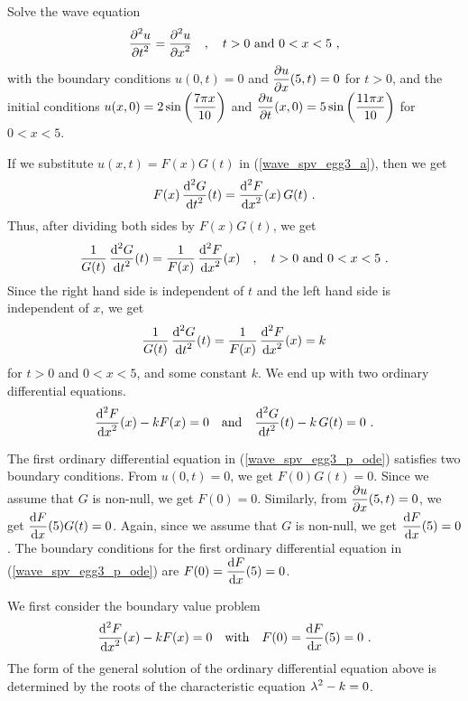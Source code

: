 \begin{egg}
Solve the wave equation
\begin{equation} \label{wave_spv_egg3_a}
\frac{\displaystyle \partial^{2}{u}} {\displaystyle \partial t^{2}} = \frac{\displaystyle \partial^{2}{u}} {\displaystyle \partial x^{2}} \quad , \quad t > 0 \
\text{and} \ 0 < x < 5 \ ,
\end{equation}
with the boundary conditions
$u(0,t) = 0$ and $\displaystyle \frac{\partial{u}}{\partial x}(5,t) = 0$ for $t > 0$,
and the initial conditions
$\displaystyle u(x,0) = 2 \sin\left(\frac{7\pi x}{10}\right)$
and
$\displaystyle \frac{\partial{u}}{\partial t}(x,0) = 5 \sin\left(\frac{11 \pi x}{10}\right)$
for $0 < x < 5$.

If we substitute $u(x,t) = F(x)G(t)$ in (\ref{wave_spv_egg3_a}), then we get
\[
F(x)\,\frac{\displaystyle \mathrm{d}^{2}{G}} {\displaystyle \mathrm{d}{t}^{2}}(t) = \frac{\displaystyle \mathrm{d}^{2}{F}} {\displaystyle \mathrm{d}{x}^{2}}(x)\, G(t) \ .
\]
Thus, after dividing both sides by $F(x)G(t)$, we get
\[
\frac{1}{G(t)} \, \frac{\displaystyle \mathrm{d}^{2}{G}} {\displaystyle \mathrm{d}{t}^{2}}(t) = \frac{1}{F(x)}\, \frac{\displaystyle \mathrm{d}^{2}{F}} {\displaystyle \mathrm{d}{x}^{2}}(x)
\quad , \quad t>0 \ \text{and} \ 0<x<5 \ .
\]
Since the right hand side is independent of $t$ and the left hand side
is independent of $x$, we get
\[
\frac{1}{G(t)} \, \frac{\displaystyle \mathrm{d}^{2}{G}} {\displaystyle \mathrm{d}{t}^{2}}(t) = \frac{1}{F(x)}\,
\frac{\displaystyle \mathrm{d}^{2}{F}} {\displaystyle \mathrm{d}{x}^{2}}(x) = k
\]
for $t>0$ and $0<x<5$, and some constant $k$.  We end up with two
ordinary differential equations.
\begin{equation} \label{wave_spv_egg3_p_ode}
\frac{\displaystyle \mathrm{d}^{2}{F}} {\displaystyle \mathrm{d}{x}^{2}}(x) -k F(x) = 0 \quad \text{and}
\quad \frac{\displaystyle \mathrm{d}^{2}{G}} {\displaystyle \mathrm{d}{t}^{2}}(t) - k\,G(t) = 0 \ .
\end{equation}

The first ordinary differential equation in
(\ref{wave_spv_egg3_p_ode}) satisfies two boundary
conditions.   From $u(0,t) = 0$, we get $F(0)G(t)=0$.  Since we assume
that $G$ is non-null, we get $F(0)=0$.  Similarly, from
$\displaystyle \frac{\partial{u}}{\partial x}(5,t) = 0$, we get
$\displaystyle \frac{\mathrm{d}F}{\mathrm{d}{x}}(5)G(t)=0$.
Again, since we assume that $G$ is non-null, we get
$\displaystyle \frac{\mathrm{d}F}{\mathrm{d}{x}}(5)=0$.  The
boundary conditions for the first ordinary differential equation in
(\ref{wave_spv_egg3_p_ode}) are $\displaystyle F(0)=\frac{\mathrm{d}F}{\mathrm{d}{x}}(5)=0$. 

We first consider the boundary value problem
\begin{equation} \label{wave_spv_egg3_p_bvp}
\frac{\displaystyle \mathrm{d}^{2}{F}} {\displaystyle \mathrm{d}{x}^{2}}(x) -k F(x) = 0 \quad \text{with} \quad
F(0)=\frac{\mathrm{d}F}{\mathrm{d}{x}}(5)=0 \ .
\end{equation}
The form of the general solution of the ordinary differential equation
above is determined by the roots of the characteristic equation
$\displaystyle \lambda^2-k=0$.


\end{egg}
